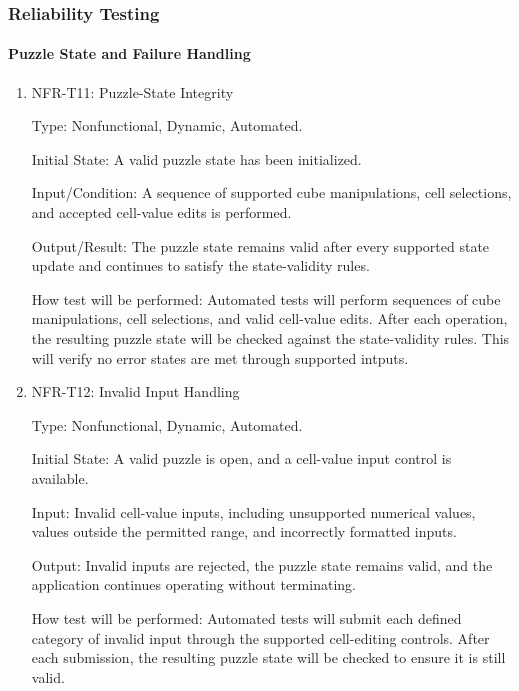 \documentclass[12pt, titlepage]{article}
\begin{document}
\subsubsection{Reliability Testing}

\paragraph{Puzzle State and Failure Handling}

\begin{enumerate}

\item{NFR-T11: Puzzle-State Integrity\\}

Type: Nonfunctional, Dynamic, Automated.

Initial State: A valid puzzle state has been initialized.

Input/Condition: A sequence of supported cube manipulations,
cell selections, and accepted cell-value edits is performed.

Output/Result: The puzzle state remains valid after every supported
state update and continues to satisfy the state-validity rules.

How test will be performed: Automated tests will perform sequences
of cube manipulations, cell selections, and valid cell-value edits.
After each operation, the resulting puzzle state will be checked
against the state-validity rules. This will verify no error states
are met through supported intputs.

\item{NFR-T12: Invalid Input Handling\\}

Type: Nonfunctional, Dynamic, Automated.

Initial State: A valid puzzle is open, and a cell-value input control
is available.

Input: Invalid cell-value inputs, including unsupported numerical
values, values outside the permitted range, and incorrectly formatted
inputs.

Output: Invalid inputs are rejected, the puzzle state remains valid,
and the application continues operating without terminating.

How test will be performed: Automated tests will submit each defined
category of invalid input through the supported cell-editing controls.
After each submission, the resulting puzzle state will be checked
to ensure it is still valid.


\end{enumerate}
\end{document}
